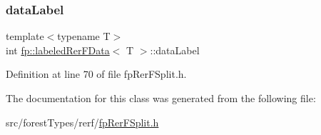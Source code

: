 \subsubsection{\texorpdfstring{data\+Label}{dataLabel}}
{\footnotesize\ttfamily template$<$typename T$>$ \\
int \hyperlink{classfp_1_1labeledRerFData}{fp\+::labeled\+Rer\+F\+Data}$<$ T $>$\+::data\+Label\hspace{0.3cm}{\ttfamily [protected]}}



Definition at line 70 of file fp\+Rer\+F\+Split.\+h.



The documentation for this class was generated from the following file\+:\begin{DoxyCompactItemize}
\item 
src/forest\+Types/rerf/\hyperlink{fpRerFSplit_8h}{fp\+Rer\+F\+Split.\+h}\end{DoxyCompactItemize}
